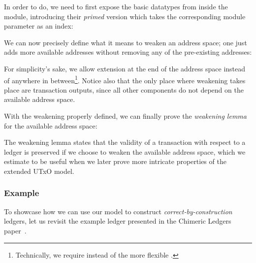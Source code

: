 \documentclass[acmsmall,nonacm=true,screen=true]{acmart}
\begin{document}
In order to do, we need to first expose the basic datatypes from inside the module,
introducing their \textit{primed} version which takes the corresponding module parameter as an index:

\UTXOprimedTypes{}

We can now precisely define what it means to weaken an address space; one just adds more available
addresses without removing any of the pre-existing addresses:

\UTXOweaken{}

\noindent
For simplicity's sake, we allow extension at the end of the address space instead of anywhere in
between\footnote{Technically, we require \inlinePrefix{} instead of the more flexible \inlineSubset{}.}.
Notice also that the only place where weakening takes place are transaction outputs, since all other
components do not depend on the available address space.

With the weakening properly defined, we can finally prove the \textit{weakening lemma} for the available address space:

\UTXOweakenLemma{}

\noindent
The weakening lemma states that the validity of a transaction with respect to a ledger is preserved if
we choose to weaken the available address space, which we estimate to be useful when we later prove more 
intricate properties of the extended UTxO model.

\subsubsection{Example} \label{subsec:utxo-example}
To showcase how we can use our model to construct \textit{correct-by-construction} ledgers,
let us revisit the example ledger presented in the Chimeric Ledgers paper~\cite{chimeric}.
\end{document}
